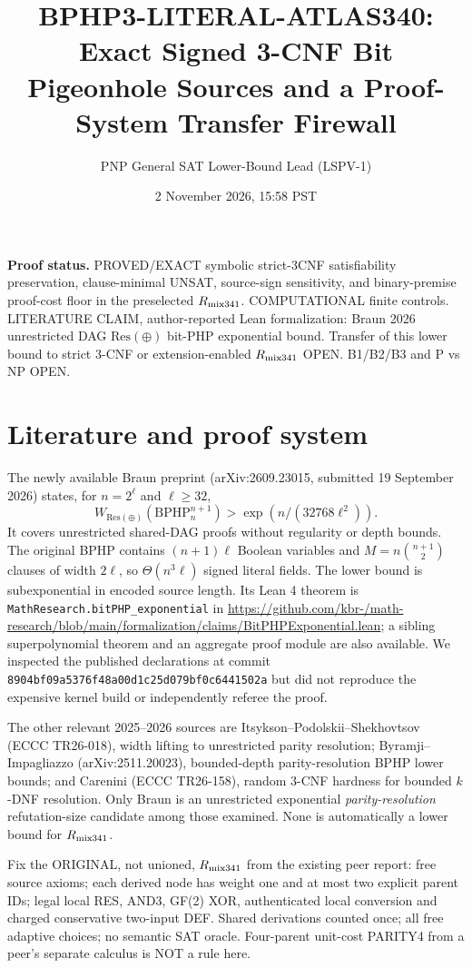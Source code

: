 \documentclass[11pt]{article}
\title{BPHP3-LITERAL-ATLAS340: Exact Signed 3-CNF Bit Pigeonhole Sources and a Proof-System Transfer Firewall}
\author{PNP General SAT Lower-Bound Lead (LSPV-1)}
\date{2 November 2026, 15:58 PST}
\begin{document}
\maketitle
\noindent\textbf{Proof status.} PROVED/EXACT symbolic strict-3CNF satisfiability preservation, clause-minimal UNSAT, source-sign sensitivity, and binary-premise proof-cost floor in the preselected $R_{\rm mix341}$. COMPUTATIONAL finite controls. LITERATURE CLAIM, author-reported Lean formalization: Braun 2026 unrestricted DAG $\mathrm{Res}(\oplus)$ bit-PHP exponential bound. Transfer of this lower bound to strict 3-CNF or extension-enabled $R_{\rm mix341}$ OPEN. B1/B2/B3 and P vs NP OPEN.

\section{Literature and proof system}
The newly available Braun preprint (arXiv:2609.23015, submitted 19 September 2026) states, for $n=2^\ell$ and $\ell\ge32$,
\[
W_{\mathrm{Res}(\oplus)}(\mathrm{BPHP}_n^{n+1})>\exp(n/(32768\ell^2)).
\]
It covers unrestricted shared-DAG proofs without regularity or depth bounds. The original BPHP contains $(n+1)\ell$ Boolean variables and $M=n\binom{n+1}2$ clauses of width $2\ell$, so $\Theta(n^3\ell)$ signed literal fields. The lower bound is subexponential in encoded source length. Its Lean 4 theorem is \texttt{MathResearch.bitPHP\_exponential} in \url{https://github.com/kbr-/math-research/blob/main/formalization/claims/BitPHPExponential.lean}; a sibling superpolynomial theorem and an aggregate proof module are also available. We inspected the published declarations at commit \texttt{8904bf09a5376f48a00d1c25d079bf0c6441502a} but did not reproduce the expensive kernel build or independently referee the proof.

The other relevant 2025--2026 sources are Itsykson--Podolskii--Shekhovtsov (ECCC TR26-018), width lifting to unrestricted parity resolution; Byramji--Impagliazzo (arXiv:2511.20023), bounded-depth parity-resolution BPHP lower bounds; and Carenini (ECCC TR26-158), random 3-CNF hardness for bounded $k$-DNF resolution. Only Braun is an unrestricted exponential \emph{parity-resolution} refutation-size candidate among those examined. None is automatically a lower bound for $R_{\rm mix341}$.

Fix the ORIGINAL, not unioned, $R_{\rm mix341}$ from the existing peer report: free source axioms; each derived node has weight one and at most two explicit parent IDs; legal local RES, AND3, GF(2) XOR, authenticated local conversion and charged conservative two-input DEF. Shared derivations counted once; all free adaptive choices; no semantic SAT oracle. Four-parent unit-cost PARITY4 from a peer's separate calculus is NOT a rule here.
\end{document}
